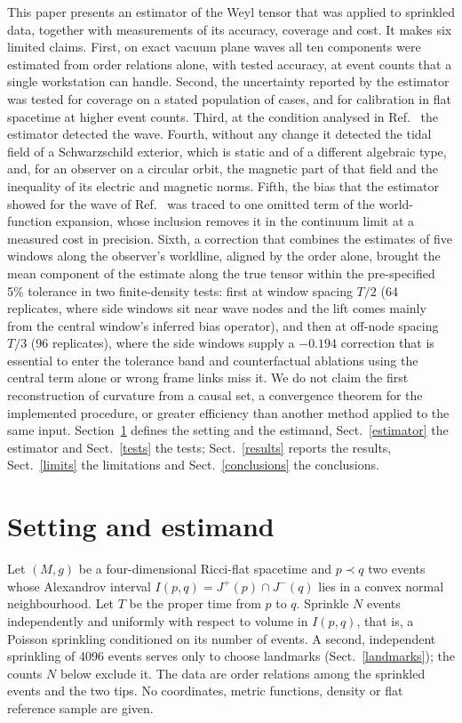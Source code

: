 \documentclass[11pt,a4paper]{article}
\begin{document}
This paper presents an estimator of the Weyl tensor that was applied to
sprinkled data, together with measurements of its accuracy, coverage and
cost. It makes six limited claims. First, on exact vacuum plane waves all
ten components were estimated from order relations alone, with tested
accuracy, at event counts that a single workstation can handle. Second, the
uncertainty reported by the estimator was tested for coverage on a stated
population of cases, and for calibration in flat spacetime at higher event
counts. Third, at the condition analysed in Ref.~\cite{ib} the estimator
detected the wave. Fourth, without any change it detected the tidal field of
a Schwarzschild exterior, which is static and of a different algebraic type,
and, for an observer on a circular orbit, the magnetic part of that field and
the inequality of its electric and magnetic norms.
Fifth, the bias that the estimator showed for the wave of Ref.~\cite{ib} was
traced to one omitted term of the world-function expansion, whose inclusion
removes it in the continuum limit at a measured cost in precision. Sixth,
a correction that combines the estimates of five windows along the
observer's worldline, aligned by the order alone, brought the mean component
of the estimate along the true tensor within the pre-specified 5\% tolerance
in two finite-density tests: first at window spacing $T/2$ (64 replicates,
where side windows sit near wave nodes and the lift comes mainly from the
central window's inferred bias operator), and then at off-node spacing $T/3$
(96 replicates), where the side windows supply a $-0.194$ correction that is
essential to enter the tolerance band and counterfactual ablations using the
central term alone or wrong frame links miss it. We do not
claim the first reconstruction of curvature from a causal set, a convergence
theorem for the implemented procedure, or greater efficiency than another
method applied to the same input. Section~\ref{setting} defines the setting
and the estimand, Sect.~\ref{estimator} the estimator and
Sect.~\ref{tests} the tests; Sect.~\ref{results} reports the results,
Sect.~\ref{limits} the limitations and Sect.~\ref{conclusions} the
conclusions.

\section{Setting and estimand}\label{setting}
Let $(M,g)$ be a four-dimensional Ricci-flat spacetime and $p\prec q$ two
events whose Alexandrov interval $I(p,q)=J^+(p)\cap J^-(q)$ lies in a convex
normal neighbourhood. Let $T$ be the proper time from $p$ to $q$. Sprinkle
$N$ events independently and uniformly with respect to volume in $I(p,q)$,
that is, a Poisson sprinkling conditioned on its number of events. A
second, independent sprinkling of 4096 events serves only to choose landmarks
(Sect.~\ref{landmarks}); the counts $N$ below exclude it. The data are order
relations among the sprinkled events and the two tips. No coordinates,
metric functions, density or flat reference sample are given.
\end{document}
